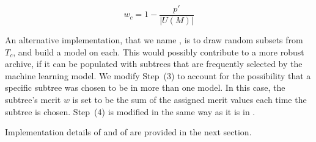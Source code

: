 
\begin{equation}
\label{eq:subtree_contrib}
w_c = 1 - \frac{p'}{|U(M)|}
\end{equation}

An alternative implementation, that we name \DRAW,  is to draw random subsets from $T_{c}$, and build a model on each.  This would possibly contribute to a more robust archive, if it can be populated with subtrees that are frequently selected by the machine learning model.  We modify Step~(3) to account for the possibility that a specific subtree was chosen to be in more than one model.  In this case, the subtree's merit $w$ is set to be the sum of the assigned merit values each time the subtree is chosen.  Step~(4) is modified in the same way as it is in \FULL.

Implementation details of \FULL and of \DRAW are provided in the next section.  


